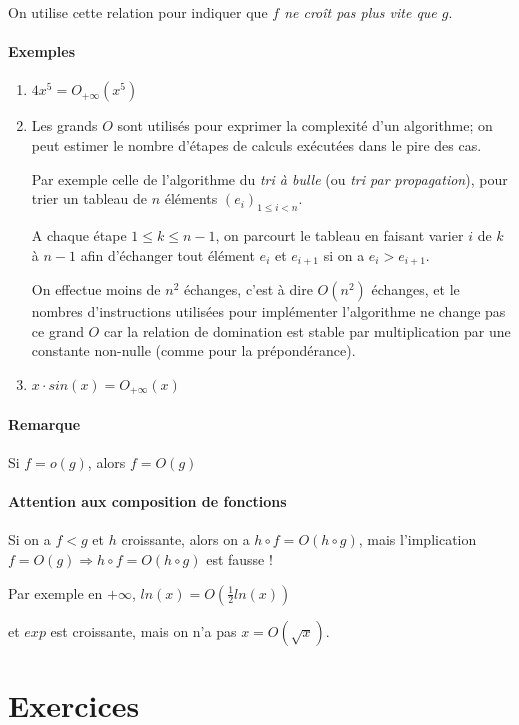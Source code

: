 \documentclass[]{article}
\begin{document}
On utilise cette relation pour indiquer que \textit{$f$ ne croît pas plus vite que $g$}.

\paragraph{Exemples}
\begin{enumerate}
	\item $4x^5=O_{+\infty}(x^5)$
	
	\item Les grands $O$ sont utilisés pour exprimer la complexité d'un algorithme; on peut estimer le nombre d'étapes de calculs exécutées dans le pire des cas.
	
	Par exemple celle de l'algorithme du \textit{tri à bulle} (ou \textit{tri par propagation}), pour trier un tableau de $n$ éléments $(e_i)_{1 \leqslant i < n}$.
	
	A chaque étape $1 \leqslant k \leqslant n-1$, on parcourt le tableau en faisant varier $i$ de $k$ à $n-1$ afin d'échanger tout élément $e_i$ et $e_{i+1}$ si on a $e_i > e_{i+1}$.
	
	On effectue moins de $n^2$ échanges, c'est à dire $O(n^2)$ échanges, et le nombres d'instructions utilisées pour implémenter l'algorithme ne change pas ce grand $O$ car la relation de domination est stable par multiplication par une constante non-nulle (comme pour la prépondérance).
	
	\item $x \cdot sin(x) = O_{+\infty}(x)$
\end{enumerate}

\paragraph{Remarque}
Si $f=o(g)$, alors $f=O(g)$

\paragraph{Attention aux composition de fonctions}
Si on a $f < g$ et $h$ croissante, alors on a $h \circ f = O(h \circ g)$, mais l'implication $f=O(g) \Longrightarrow h \circ f = O(h \circ g)$ est fausse !

Par exemple en $+\infty$, $ln(x)=O\left(\frac{1}{2}ln(x)\right)$

et $exp$ est croissante, mais on n'a pas $x = O(\sqrt{x})$.

\section{Exercices}
\end{document}
